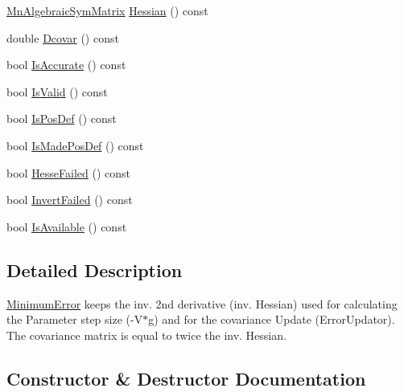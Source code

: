 \begin{DoxyCompactItemize}
\item 
\mbox{\hyperlink{namespaceROOT_1_1Minuit2_a9e74ad97f5537a2e80e52b04d98ecc6e}{Mn\+Algebraic\+Sym\+Matrix}} \mbox{\hyperlink{classROOT_1_1Minuit2_1_1MinimumError_a7f591009a8e0d017a77da5efa5f6a7e0}{Hessian}} () const
\item 
double \mbox{\hyperlink{classROOT_1_1Minuit2_1_1MinimumError_acd4dec46c23542a2b79183a6d5fe6679}{Dcovar}} () const
\item 
bool \mbox{\hyperlink{classROOT_1_1Minuit2_1_1MinimumError_a70c9ff6b59f2c01e5e54b4010326753d}{Is\+Accurate}} () const
\item 
bool \mbox{\hyperlink{classROOT_1_1Minuit2_1_1MinimumError_a0e9a9c525f7ac2e5dc5c7973056a852b}{Is\+Valid}} () const
\item 
bool \mbox{\hyperlink{classROOT_1_1Minuit2_1_1MinimumError_afffbed3fdd6785c959ca619a59aaaf74}{Is\+Pos\+Def}} () const
\item 
bool \mbox{\hyperlink{classROOT_1_1Minuit2_1_1MinimumError_addbc60edad85c271c20be5ff18678599}{Is\+Made\+Pos\+Def}} () const
\item 
bool \mbox{\hyperlink{classROOT_1_1Minuit2_1_1MinimumError_adf8acb6ea4137162b034eb6b9a79d9b9}{Hesse\+Failed}} () const
\item 
bool \mbox{\hyperlink{classROOT_1_1Minuit2_1_1MinimumError_ae9f212180703d5504c281f90efee263a}{Invert\+Failed}} () const
\item 
bool \mbox{\hyperlink{classROOT_1_1Minuit2_1_1MinimumError_af03638c23ec7b5573c139810cdb640c0}{Is\+Available}} () const
\end{DoxyCompactItemize}


\subsection{Detailed Description}
\mbox{\hyperlink{classROOT_1_1Minuit2_1_1MinimumError}{Minimum\+Error}} keeps the inv. 2nd derivative (inv. Hessian) used for calculating the Parameter step size (-\/V$\ast$g) and for the covariance Update (Error\+Updator). The covariance matrix is equal to twice the inv. Hessian. 

\subsection{Constructor \& Destructor Documentation}
\mbox{\label{classROOT_1_1Minuit2_1_1MinimumError_a4438a39dcecf1990ed8449d1bad58116}} 
